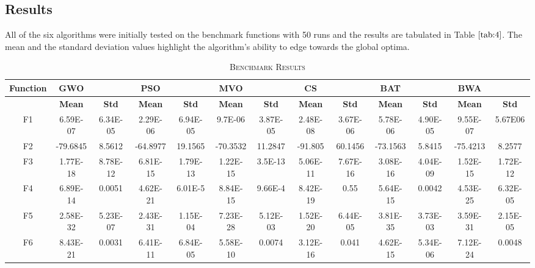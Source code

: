 \documentclass[conference]{IEEEtran}
\begin{document}
\subsection{Results}

All of the six algorithms were initially tested on the benchmark functions with 50 runs and the results are tabulated in Table $\ref{tab:4}$. The mean and the standard deviation values highlight the algorithm's ability to edge towards the global optima. 

\begin{table}[t]
\caption{\textsc{Benchmark Results}}
\label{tab:4}
\centering
\scalebox{0.8}
{
\begin{tabular}{| c | c  c | c  c | c  c | c  c | c  c | c  c |}
\hline
{\textbf{Function}}&{\textbf{GWO}}&{}&{\textbf{PSO}}&{}&{\textbf{MVO}}&{}&{\textbf{CS}}&{}&{\textbf{BAT}}&{}&{\textbf{BWA}}&{}\\
\hline
{}&{\textbf{Mean}}&{\textbf{Std}}&{\textbf{Mean}}&{\textbf{Std}}&{\textbf{Mean}}&{\textbf{Std}}&{\textbf{Mean}}&{\textbf{Std}}&{\textbf{Mean}}&{\textbf{Std}}&{\textbf{Mean}}&{\textbf{Std}}\\
\hline
{F1}&{6.59E-07}&{6.34E-05}&{2.29E-06}&{6.94E-05}&{9.7E-06}&{3.87E-05}&{2.48E-08}&{3.67E-06}&{5.78E-06}&{4.90E-05}&{9.55E-07}&{5.67E06}\\
{F2}&{-79.6845}&{8.5612}&{-64.8977}&{19.1565}&{-70.3532}&{11.2847}&{-91.805}&{60.1456}&{-73.1563}&{5.8415}&{-75.4213}&{8.2577}\\
{F3}&{1.77E-18}&{8.78E-12}&{6.81E-15}&{1.79E-13}&{1.22E-15}&{3.5E-13}&{5.06E-11}&{7.67E-16}&{3.08E-16}&{4.04E-09}&{1.52E-15}&{1.72E-12}\\
{F4}&{6.89E-14}&{0.0051}&{4.62E-21}&{6.01E-5}&{8.84E-15}&{9.66E-4}&{8.42E-19}&{0.55}&{5.64E-15}&{0.0042}&{4.53E-25}&{6.32E-05}\\
{F5}&{2.58E-32}&{5.23E-07}&{2.43E-31}&{1.15E-04}&{7.23E-28}&{5.12E-03}&{1.52E-20}&{6.44E-05}&{3.81E-35}&{3.73E-03}&{3.59E-31}&{2.15E-05}\\
{F6}&{8.43E-21}&{0.0031}&{6.41E-11}&{6.84E-05}&{5.58E-10}&{0.0074}&{3.12E-16}&{0.041}&{4.62E-15}&{5.34E-06}&{7.12E-24}&{0.0048}\\
\hline
\end{tabular}
}
\end{table}
\end{document}
